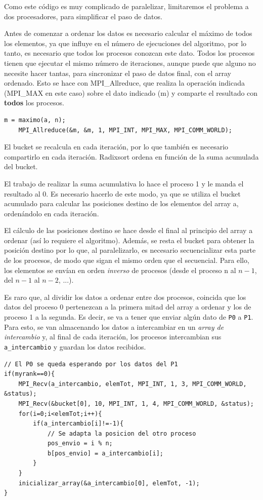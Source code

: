 
Como este código es muy complicado de paralelizar, limitaremos el problema a dos procesadores, para simplificar el paso de datos.

Antes de comenzar a ordenar los datos es necesario calcular el máximo de todos los elementos, ya que influye en el número de ejecuciones del algoritmo, por lo tanto, es necesario que todos los procesos conozcan este dato. Todos los procesos tienen que ejecutar el mismo número de iteraciones, aunque puede que alguno no necesite hacer tantas, para sincronizar el paso de datos final, con el array ordenado.
Esto se hace con MPI\_Allreduce, que realiza la operación indicada (MPI\_MAX en este caso) sobre el dato indicado (m) y comparte el resultado con \textbf{todos} los procesos.
\begin{lstlisting}[frame=single]
	m = maximo(a, n);
	MPI_Allreduce(&m, &m, 1, MPI_INT, MPI_MAX, MPI_COMM_WORLD);
\end{lstlisting}

El bucket se recalcula en cada iteración, por lo que también es necesario compartirlo en cada iteración. Radixsort ordena en función de la suma acumulada del bucket.

El trabajo de realizar la suma acumulativa lo hace el proceso 1 y le manda el resultado al 0. Es necesario hacerlo de este modo, ya que se utiliza el bucket acumulado para calcular las posiciones destino de los elementos del array a, ordenándolo en cada iteración.

El cálculo de las posiciones destino se hace desde el final al principio del array a ordenar (así lo requiere el algoritmo). Además, se resta el bucket para obtener la posición destino por lo que, al paralelizarlo, es necesario secuencializar esta parte de los procesos, de modo que sigan el mismo orden que el secuencial. Para ello, los elementos se envían en orden \emph{inverso} de procesos (desde el proceso n al $n-1$, del $n-1$ al $n-2$, ...).

Es raro que, al dividir los datos a ordenar entre dos procesos, coincida que los datos del proceso 0 pertenezcan a la primera mitad del array a ordenar y los de proceso 1 a la segunda. Es decir, se va a tener que enviar algún dato de \texttt{P0} a \texttt{P1}. Para esto, se van almacenando los datos a intercambiar en un \emph{array de intercambio} y, al final de cada iteración, los procesos intercambian sus \texttt{a\_intercambio} y guardan los datos recibidos.

\begin{lstlisting}[frame=single]
// El P0 se queda esperando por los datos del P1
if(myrank==0){
	MPI_Recv(a_intercambio, elemTot, MPI_INT, 1, 3, MPI_COMM_WORLD, &status);
	MPI_Recv(&bucket[0], 10, MPI_INT, 1, 4, MPI_COMM_WORLD, &status);
	for(i=0;i<elemTot;i++){
		if(a_intercambio[i]!=-1){
			// Se adapta la posicion del otro proceso
			pos_envio = i % n;
			b[pos_envio] = a_intercambio[i];
		}
	}
	inicializar_array(&a_intercambio[0], elemTot, -1);
}
\end{lstlisting}

